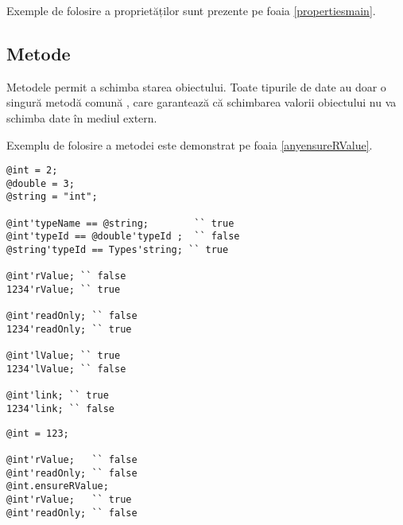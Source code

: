 Exemple de folosire a proprietăților sunt prezente pe foaia \ref{propertiesmain}.

\subsection{Metode}

Metodele permit a schimba starea obiectului. Toate tipurile de date au doar o singură metodă comună , care garantează că schimbarea valorii obiectului nu va schimba date în mediul extern.

Exemplu de folosire a metodei  este demonstrat pe foaia \ref{anyensureRValue}.

\begin{lstlisting}[caption=Proprietăți, label=propertiesmain]
@int = 2;
@double = 3;
@string = "int";

@int'typeName == @string;		 `` true
@int'typeId == @double'typeId ;	 `` false
@string'typeId == Types'string; `` true

@int'rValue; `` false
1234'rValue; `` true

@int'readOnly; `` false
1234'readOnly; `` true

@int'lValue; `` true
1234'lValue; `` false

@int'link; `` true
1234'link; `` false
\end{lstlisting}


\begin{lstlisting}[caption=Metoda any.ensureRValue, label=anyensureRValue]
@int = 123;

@int'rValue;   `` false
@int'readOnly; `` false
@int.ensureRValue;
@int'rValue;   `` true
@int'readOnly; `` false
\end{lstlisting}